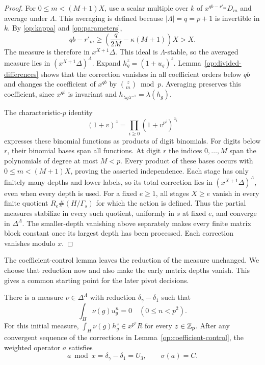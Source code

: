 \begin{proof}
For $0\le m<(M+1)X$, use a scalar multiple over $k$ of
$x^{qb-r'_m}D_m$ and average under $\Lambda$. This averaging is
defined because $|\Lambda|=q=p+1$ is invertible in $k$. By
\eqref{op:kappa} and \eqref{op:parameters},
\begin{equation}
 qb-r'_m\ge
 \left(\frac q{2M}-\kappa(M+1)\right)X>X.
 \label{op:correction-bound}
\end{equation}
The measure is therefore in $x^{X+1}\Delta$. This ideal is
$\Lambda$-stable, so the averaged measure lies in
$(x^{X+1}\Delta)^\Lambda$. Expand
$h_g^z=(1+u_g)^z$. Lemma~\ref{op:divided-differences} shows that the
correction vanishes in all coefficient orders below $qb$ and changes
the coefficient of $x^{qb}$ by $\binom zm\bmod p$. Averaging preserves
this coefficient, since $x^{qb}$ is invariant and
$h_{\lambda g\lambda^{-1}}=\lambda(h_g)$.

The characteristic-$p$ identity
\[
 (1+v)^z=\prod_{i\ge0}(1+v^{p^i})^{z_i}
\]
expresses these binomial functions as products of digit binomials.
For digits below $r$, their binomial bases span all functions. At
digit $r$ the indices $0,\ldots,M$ span the polynomials of degree at
most $M<p$. Every product of these bases occurs with
$0\le m<(M+1)X$, proving the asserted independence.
Each stage has only finitely many depths and lower labels, so its
total correction lies in $(x^{X+1}\Delta)^\Lambda$, even when every
depth is used. For a fixed $e\ge1$, all stages $X\ge e$ vanish in
every finite quotient $R_e\#(H/\Gamma_s)$ for which the action is
defined. Thus the partial measures stabilize in every such quotient,
uniformly in $s$ at fixed $e$, and converge in $\Delta^\Lambda$.
The smaller-depth vanishing above separately makes every finite
matrix block constant once its largest depth has been processed.
Each correction vanishes modulo $x$.
\end{proof}

The coefficient-control lemma leaves the reduction of the measure
unchanged. We choose that reduction now and also make the early
matrix depths vanish. This gives a common starting point for the
later pivot decisions.

\begin{lemma}[Initialization]
\label{op:initialization}
There is a measure $\nu\in\Delta^\Lambda$ with reduction
$\delta_\gamma-\delta_1$ such that
\[
 \int_H\nu(g)u_g^n=0\quad(0\le n<p^2).
\]
For this initial measure,
$\int_H\nu(g)h_g^z\in x^{p^2}R$ for every $z\in\mathbb Z_p$.
After any convergent sequence of the corrections in
Lemma~\ref{op:coefficient-control}, the weighted operator $a$ satisfies
\begin{equation}
 a\bmod x=\delta_\gamma-\delta_1=U_3,
 \qquad \sigma(a)=C.
 \label{op:initial-symbol}
\end{equation}
\end{lemma}

